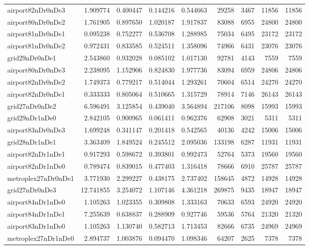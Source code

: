 \begin{longtable}{|l|r|r|r|r|r|r|r|r|}
airport82nDr0nDe3 & 1.909774 & 0.400447 & 0.144216 & 0.544663 & 29258 & 3467 & 11856 & 11856 \\
airport80nDr0nDe2 & 1.761905 & 0.897650 & 1.020187 & 1.917837 & 83088 & 6955 & 24800 & 24800 \\
airport81nDr0nDe1 & 0.095238 & 0.752277 & 0.536708 & 1.288985 & 75034 & 6495 & 23172 & 23172 \\
airport81nDr0nDe2 & 0.972431 & 0.833585 & 0.524511 & 1.358096 & 74966 & 6431 & 23076 & 23076 \\
grid29nDr0nDe1 & 2.543860 & 0.932028 & 0.085102 & 1.017130 & 92781 & 4143 & 7559 & 7559 \\
airport80nDr0nDe3 & 2.238095 & 1.152906 & 0.824830 & 1.977736 & 83094 & 6959 & 24806 & 24806 \\
airport82nDr0nDe2 & 1.749373 & 0.779217 & 0.514044 & 1.293261 & 70604 & 6514 & 24270 & 24270 \\
airport82nDr0nDe1 & 0.333333 & 0.805064 & 0.510665 & 1.315729 & 78914 & 7146 & 26143 & 26143 \\
grid27nDr0nDe2 & 6.596491 & 3.125854 & 0.439040 & 3.564894 & 217106 & 8098 & 15993 & 15993 \\
grid29nDr1nDe0 & 2.842105 & 0.900965 & 0.061411 & 0.962376 & 62908 & 3021 & 5311 & 5311 \\
airport83nDr0nDe3 & 1.699248 & 0.341147 & 0.201418 & 0.542565 & 40136 & 4242 & 15006 & 15006 \\
grid28nDr1nDe1 & 3.363409 & 1.849524 & 0.245512 & 2.095036 & 133198 & 6287 & 11931 & 11931 \\
airport82nDr1nDe1 & 0.917293 & 0.598672 & 0.393801 & 0.992473 & 52764 & 5373 & 19560 & 19560 \\
airport82nDr1nDe0 & 0.789474 & 0.839015 & 0.477403 & 1.316418 & 78666 & 6910 & 25787 & 25787 \\
metroplex27nDr0nDe1 & 3.771930 & 2.299227 & 0.438175 & 2.737402 & 158645 & 4872 & 14928 & 14928 \\
grid27nDr0nDe3 & 12.741855 & 3.254072 & 1.107146 & 4.361218 & 269875 & 9435 & 18947 & 18947 \\
airport84nDr1nDe0 & 1.105263 & 1.023355 & 0.309808 & 1.333163 & 70633 & 6593 & 24920 & 24920 \\
airport84nDr1nDe1 & 7.255639 & 0.638837 & 0.288909 & 0.927746 & 59536 & 5764 & 21320 & 21320 \\
airport83nDr1nDe0 & 1.105263 & 1.130740 & 0.582713 & 1.713453 & 82666 & 6735 & 24969 & 24969 \\
metroplex27nDr1nDe0 & 2.894737 & 1.003876 & 0.094470 & 1.098346 & 64207 & 2625 & 7378 & 7378 \\

\end{longtable}
